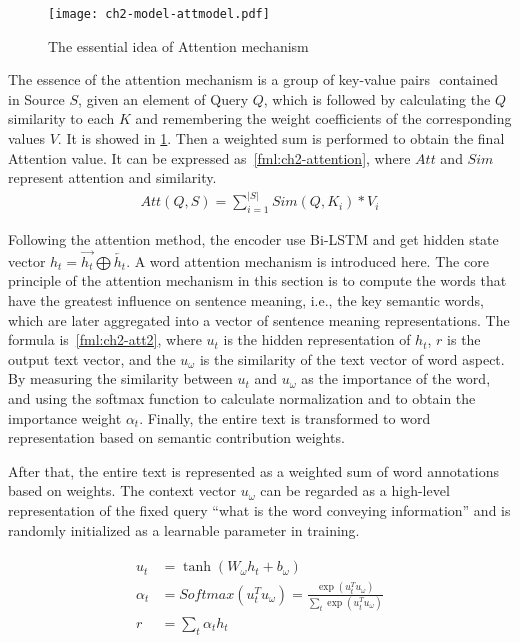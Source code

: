 \begin{figure}[htbp!]
	\centering
	\texttt{[image: ch2-model-attmodel.pdf]}
	\caption{The essential idea of Attention mechanism}\label{fig:ch2-model-attmodel}
\end{figure}


The essence of the attention mechanism is a group of key-value pairs \(<K, V>\) contained in Source \(S\), given an element of Query \(Q\), which is followed by calculating the \(Q\) similarity to each \(K\) and remembering the weight coefficients of the corresponding values \(V\). It is showed in \figurename{\ref{fig:ch2-model-attmodel}}. Then a weighted sum is performed to obtain the final Attention value. It can be expressed as~\ref{fml:ch2-attention}, where \(Att\) and \(Sim\) represent attention and similarity.
\begin{align}\label{fml:ch2-attention}
	Att(Q,S) = \sum_{i=1}^{|S|}Sim(Q,K_i)*V_i
\end{align}

Following the attention method, the encoder use Bi-LSTM and get hidden state vector \(h_t=\overrightarrow{h_t}\bigoplus \overleftarrow{h_t}\). A word attention mechanism is introduced here. The core principle of the attention mechanism in this section is to compute the words that have the greatest influence on sentence meaning, i.e., the key semantic words, which are later aggregated into a vector of sentence meaning representations. The formula is~\ref{fml:ch2-att2}, where \(u_t\) is the hidden representation of \(h_t\), \(r\) is the output text vector, and the \(u_\omega \) is the similarity of the text vector of word aspect. By measuring the similarity between \(u_t\) and \(u_\omega \) as the importance of the word, and using the softmax function to calculate normalization and to obtain the importance weight \(\alpha_{t}\). Finally, the entire text is transformed to word representation based on semantic contribution weights.

%
After that, the entire text is represented as a weighted sum of word annotations based on weights. The context vector \(u_\omega \) can be regarded as a high-level representation of the fixed query ``what is the word conveying information'' and is randomly initialized as a learnable parameter in training.


\begin{align}\label{fml:ch2-att2}
	\begin{split}
		u_t      & = \tanh(W_\omega h_t + b_\omega )                                                    \\
		\alpha_t & =Softmax(u_t^T u_\omega) = \frac{\exp( u_t^T u_\omega)}{\sum_t \exp(u_t^T u_\omega)} \\
		r        & = \sum_t{\alpha_t h_t}
	\end{split}
\end{align}

